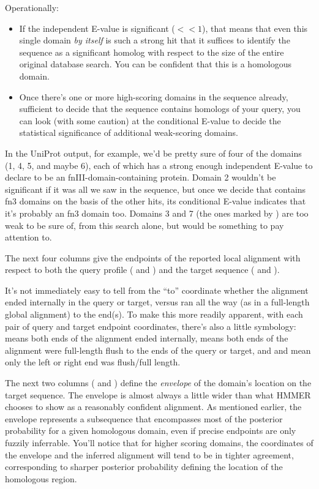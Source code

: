 Operationally:

\begin{itemize}
\item If the independent E-value is significant ($<<1$), that means
that even this single domain \emph{by itself} is such a strong hit
that it suffices to identify the sequence as a significant homolog
with respect to the size of the entire original database search. You
can be confident that this is a homologous domain.

\item Once there's one or more high-scoring domains in the sequence
already, sufficient to decide that the sequence contains homologs of
your query, you can look (with some caution) at the conditional
E-value to decide the statistical significance of additional
weak-scoring domains.
\end{itemize}

In the UniProt output, for example, we'd be pretty sure of four of the
domains (1, 4, 5, and maybe 6), each of which has a strong enough
independent E-value to declare  to be an
fnIII-domain-containing protein. Domain 2 wouldn't be significant if
it was all we saw in the sequence, but once we decide that
 contains fn3 domains on the basis of the other
hits, its conditional E-value indicates that it's probably an fn3
domain too. Domains 3 and 7 (the ones marked by ) are too weak
to be sure of, from this search alone, but would be something to pay
attention to.

The next four columns give the endpoints of the reported local
alignment with respect to both the query profile ( and
) and the target sequence ( and ).

It's not immediately easy to tell from the ``to'' coordinate whether
the alignment ended internally in the query or target, versus ran all
the way (as in a full-length global alignment) to the end(s). To make
this more readily apparent, with each pair of query and target
endpoint coordinates, there's also a little symbology: 
means both ends of the alignment ended internally, \mono{[]}
means both ends of the alignment were full-length flush to the ends of
the query or target, and \mono{[.} and \mono{.]} mean only the left or
right end was flush/full length. 

The next two columns ( and ) define the
\emph{envelope} of the domain's location on the target sequence.  The
envelope is almost always a little wider than what HMMER chooses to
show as a reasonably confident alignment. As mentioned earlier, the
envelope represents a subsequence that encompasses most of the
posterior probability for a given homologous domain, even if precise
endpoints are only fuzzily inferrable. You'll notice that for higher
scoring domains, the coordinates of the envelope and the inferred
alignment will tend to be in tighter agreement, corresponding to
sharper posterior probability defining the location of the homologous
region. 


